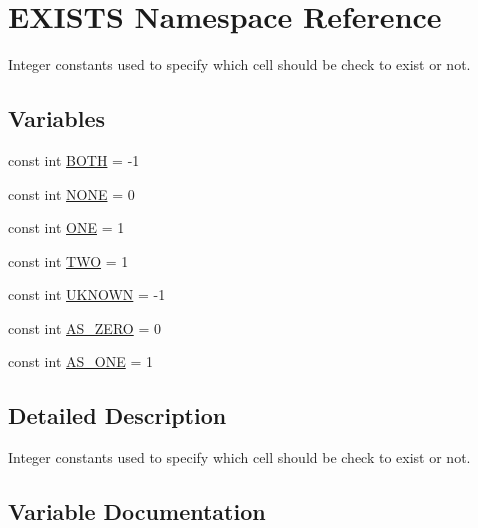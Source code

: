 \hypertarget{namespace_e_x_i_s_t_s}{}\section{E\+X\+I\+S\+TS Namespace Reference}
\label{namespace_e_x_i_s_t_s}


Integer constants used to specify which cell should be check to exist or not.  


\subsection*{Variables}
\begin{DoxyCompactItemize}
\item 
const int \hyperlink{namespace_e_x_i_s_t_s_a256db431572e1e7f26f8dfa6c9cae9bd}{B\+O\+TH} = -\/1
\item 
const int \hyperlink{namespace_e_x_i_s_t_s_a2f75d813424980b47f3e7c9608fb8416}{N\+O\+NE} = 0
\item 
const int \hyperlink{namespace_e_x_i_s_t_s_a4c3717397d716d2bbd69d8239b3de033}{O\+NE} = 1
\item 
const int \hyperlink{namespace_e_x_i_s_t_s_ad76d02e8eb6d20715d333b72394b0648}{T\+WO} = 1
\item 
const int \hyperlink{namespace_e_x_i_s_t_s_a81eb362d951445c658942a433afddb97}{U\+K\+N\+O\+WN} = -\/1
\item 
const int \hyperlink{namespace_e_x_i_s_t_s_a03d550dd049f50f852b8fb4caa48238a}{A\+S\+\_\+\+Z\+E\+RO} = 0
\item 
const int \hyperlink{namespace_e_x_i_s_t_s_a735e5ca6565905e84346e3ff62842a0a}{A\+S\+\_\+\+O\+NE} = 1
\end{DoxyCompactItemize}


\subsection{Detailed Description}
Integer constants used to specify which cell should be check to exist or not. 

\subsection{Variable Documentation}
\mbox{\label{namespace_e_x_i_s_t_s_a735e5ca6565905e84346e3ff62842a0a}} 
